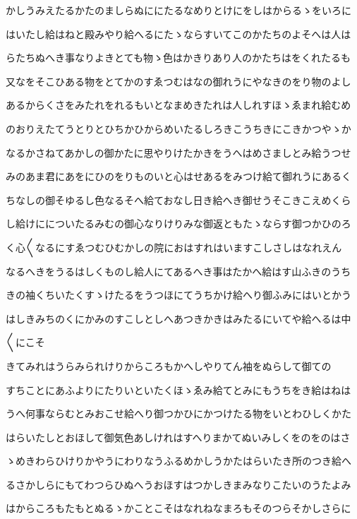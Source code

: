 \documentclass[a4paper,11pt,landscape]{ltjtarticle}
\begin{document}
\par\medskip
かしうみえたるかたのましらぬににたるなめりとけにをしはからるゝをいろに
\par\medskip
はいたし給はねと殿みやり給へるにたゝならすいてこのかたちのよそへは人は
\par\medskip
らたちぬへき事なりよきとても物ゝ色はかきりあり人のかたちはをくれたるも
\par\medskip
又なをそこひある物をとてかのすゑつむはなの御れうにやなきのをり物のよし
\par\medskip
あるからくさをみたれをれるもいとなまめきたれは人しれすほゝゑまれ給むめ
\par\medskip
のおりえたてうとりとひちかひからめいたるしろきこうちきにこきかつやゝか
\par\medskip
なるかさねてあかしの御かたに思やりけたかきをうへはめさましとみ給うつせ
\par\medskip
みのあま君にあをにひのをりものいと心はせあるをみつけ給て御れうにあるく
\par\medskip
ちなしの御そゆるし色なるそへ給ておなし日き給へき御せうそこきこえめくら
\par\medskip
し給けにについたるみむの御心なりけりみな御返ともたゝならす御つかひのろ
\par\medskip
く心〱なるにすゑつむひむかしの院におはすれはいますこしさしはなれえん
\par\medskip
なるへきをうるはしくものし給人にてあるへき事はたかへ給はす山ふきのうち
\par\medskip
きの袖くちいたくすゝけたるをうつほにてうちかけ給へり御ふみにはいとかう
\par\medskip
はしきみちのくにかみのすこしとしへあつきかきはみたるにいてや給へるは中
\par\medskip
〱にこそ
\par\medskip
きてみれはうらみられけりからころもかへしやりてん袖をぬらして御ての
\par\medskip
すちことにあふよりにたりいといたくほゝゑみ給てとみにもうちをき給はねは
\par\medskip
うへ何事ならむとみおこせ給へり御つかひにかつけたる物をいとわひしくかた
\par\medskip
はらいたしとおほして御気色あしけれはすへりまかてぬいみしくをのをのはさ
\par\medskip
ゝめきわらひけりかやうにわりなうふるめかしうかたはらいたき所のつき給へ
\par\medskip
るさかしらにもてわつらひぬへうおほすはつかしきまみなりこたいのうたよみ
\par\medskip
はからころもたもとぬるゝかことこそはなれねなまろもそのつらそかしさらに
\end{document}

